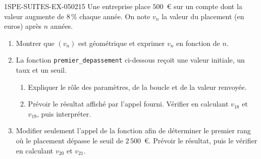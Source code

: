 \begin{exercice}{1SPE-SUITES-EX-050}{2}{15}
Une entreprise place $500$~€ sur un compte dont la valeur augmente de $8\,\%$ chaque année. On note $v_n$ la valeur du placement (en euros) après $n$ années.

\begin{enumerate}
  \item Montrer que $(v_n)$ est géométrique et exprimer $v_n$ en fonction de $n$.
  \item La fonction \texttt{premier\_depassement} ci-dessous reçoit une valeur initiale, un taux et un seuil.

  

  \begin{enumerate}
    \item Expliquer le rôle des paramètres, de la boucle et de la valeur renvoyée.
    \item Prévoir le résultat affiché par l'appel fourni. Vérifier en calculant $v_{18}$ et $v_{19}$, puis interpréter.
  \end{enumerate}
  \item Modifier seulement l'appel de la fonction afin de déterminer le premier rang où le placement dépasse le seuil de $2\,500$~\euro{}. Prévoir le résultat, puis le vérifier en calculant $v_{20}$ et $v_{21}$.
\end{enumerate}
\end{exercice}

